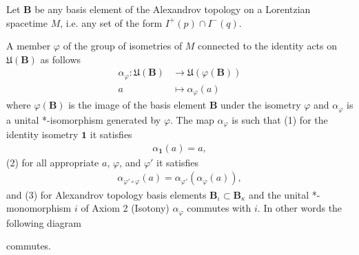 \begin{definition}
    \label{def:isometric-covariance-in-curved-spacetime}
    \leanok
    Let $\mathbf{B}$ be any basis element of the Alexandrov topology on a Lorentzian spacetime $M$, i.e. any set of the form $I^+(p) \cap I^-(q)$.
    
    A member $\varphi$ of the group of isometries of $M$ connected to the identity acts on $\mathfrak{U}(\mathbf{B})$ as follows
    \begin{align}
        \alpha_\varphi : \mathfrak{U}(\mathbf{B}) &\longrightarrow \mathfrak{U}(\varphi(\mathbf{B})) \\
                                   a              &\longmapsto     \alpha_\varphi(a)
    \end{align}
    where $\varphi(\mathbf{B})$ is the image of the basis element $\mathbf{B}$ under the isometry $\varphi$ and $\alpha_\varphi$ is a unital *-isomorphism generated by $\varphi$. The map $\alpha_\varphi$ is such that (1) for the identity isometry $\mathbf{1}$ it satisfies
    \begin{align}
        \alpha_{\mathbf{1}}(a) = a,
    \end{align}
    (2) for all appropriate $a$, $\varphi$, and $\varphi'$ it satisfies
    \begin{align}
        \alpha_{\varphi' \circ \varphi}(a) = \alpha_{\varphi'}(\alpha_{\varphi}(a)),
    \end{align}
    and (3) for Alexandrov topology basis elements $\mathbf{B}_\iota \subset \mathbf{B}_\kappa$ and the unital *-monomorphism $i$ of Axiom 2 (Isotony) $\alpha_\varphi$ commutes with $i$. In other words the following diagram

    \begin{center}
    \end{center}

    commutes.
\end{definition}

